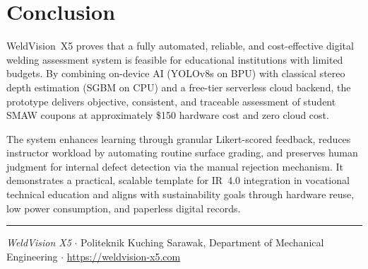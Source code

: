 \documentclass[11pt,a4paper]{article}
\begin{document}
\section{Conclusion}

WeldVision~X5 proves that a fully automated, reliable, and cost-effective digital welding assessment system
is feasible for educational institutions with limited budgets. By combining on-device AI (YOLOv8s on BPU)
with classical stereo depth estimation (SGBM on CPU) and a free-tier serverless cloud backend, the prototype
delivers objective, consistent, and traceable assessment of student SMAW coupons at approximately
\$150 hardware cost and zero cloud cost.

The system enhances learning through granular Likert-scored feedback, reduces instructor workload by
automating routine surface grading, and preserves human judgment for internal defect detection via the manual
rejection mechanism. It demonstrates a practical, scalable template for IR~4.0 integration in vocational
technical education and aligns with sustainability goals through hardware reuse, low power consumption, and
paperless digital records.

\vspace{16pt}
\noindent\rule{\linewidth}{0.8pt}
{\small\color{darkgray}
\textit{WeldVision X5} $\cdot$ Politeknik Kuching Sarawak, Department of Mechanical Engineering $\cdot$
\url{https://weldvision-x5.com}
}
\end{document}
